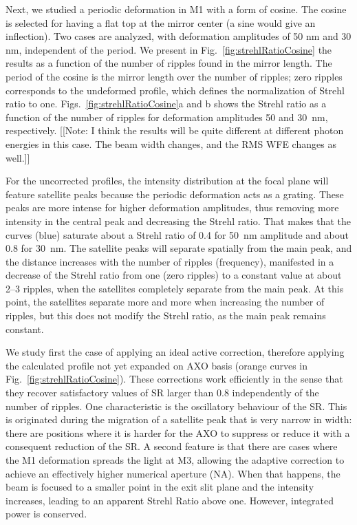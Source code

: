 \documentclass[preprint]{iucr}
\begin{document}
Next, we studied a periodic deformation in M1 with a form of cosine. The cosine is selected for having a flat top at the mirror center (a sine would give an inflection). Two cases are analyzed, with deformation amplitudes of 50 nm and 30 nm, independent of the period. We present in Fig.~\ref{fig:strehlRatioCosine} the results as a function of the number of ripples found in the mirror length. The period of the cosine is the mirror length over the number of ripples; zero ripples corresponds to the undeformed profile, which defines the normalization of Strehl ratio to one. Figs.~\ref{fig:strehlRatioCosine}a and b shows the Strehl ratio as a function of the number of ripples for deformation amplitudes 50 and 30~nm, respectively. [[Note: I think the results will be quite different at different photon energies in this case. The beam width changes, and the RMS WFE changes as well.]]

For the uncorrected profiles, the intensity distribution at the focal plane will feature satellite peaks because the periodic deformation acts as a grating. These peaks are more intense for higher deformation amplitudes, thus removing more intensity in the central peak and decreasing the Strehl ratio. That makes that the curves (blue) saturate about a Strehl ratio of 0.4 for 50~nm amplitude and about 0.8 for 30~nm. The satellite peaks will separate spatially from the main peak, and the distance increases with the number of ripples (frequency), manifested in a decrease of the Strehl ratio from one (zero ripples) to a constant value at about 2--3 ripples, when the satellites completely separate from the main peak. At this point, the satellites separate more and more when increasing the number of ripples, but this does not modify the Strehl ratio, as the main peak remains constant. 

We study first the case of applying an ideal active correction, therefore applying the calculated profile not yet expanded on AXO basis (orange curves in Fig.~\ref{fig:strehlRatioCosine}). These corrections work efficiently in the sense that they recover satisfactory values of SR larger than 0.8 independently of the number of ripples. One characteristic is the oscillatory behaviour of the SR. This is originated during the migration of a satellite peak that is very narrow in width: there are positions where it is harder for the AXO to suppress or reduce it with a consequent reduction of the SR. A second feature is that there are cases where the M1 deformation spreads the light at M3, allowing the adaptive correction to achieve an effectively higher numerical aperture (NA). When that happens, the beam is focused to a smaller point in the exit slit plane and the intensity increases, leading to an apparent Strehl Ratio above one. However, integrated power is conserved. 
\end{document}
